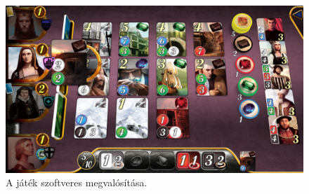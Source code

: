 \begin{figure}[h]
	\centering
	\includegraphics[scale=0.2]{images/digital_edition.jpg}
	\caption{A játék szoftveres megvalósítása.}
	\label{fig:digital}
\end{figure}